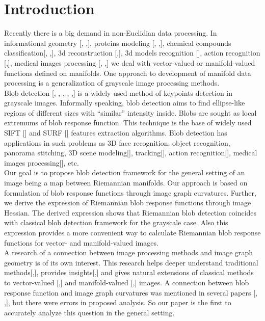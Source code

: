 \documentclass{llncs}
\begin{document}
\section{Introduction}
%
Recently there is a big demand in non-Euclidian data processing. In informational geometry [, ,], proteins modeling [, ,], chemical compounds classification[, ,], 3d reconstruction [,], 3d models recognition [], action recognition [,], medical images processing [, ,] we deal with vector-valued or manifold-valued functions defined on manifolds. One approach to development of manifold data processing is a generalization of grayscale image processing methods. 
\\
Blob detection [, , , , ,] is a widely used method of keypoints detection in grayscale images. Informally speaking, blob detection aims to find ellipse-like regions of different sizes with “similar” intensity inside. Blobs are sought as local extremums of blob response function. This technique is the base of widely used SIFT [] and SURF [] features extraction algorithms. Blob detection has applications in such problems as 3D face recognition, object recognition, panorama stitching, 3D scene modeling[], tracking[], action recognition[], medical images processing[], etc.
\\
Our goal is to propose blob detection framework for the general setting of an image being a map between Riemannian manifolds. Our approach is based on formulation of blob response functions through image graph curvatures. Further, we derive the expression of Riemannian blob response functions through image Hessian. The derived expression shows that Riemannian blob detection coincides with classical blob detection framework for the grayscale case. Also this expression provides a more convenient way to calculate Riemannian blob response functions for vector- and manifold-valued images.
\\
A research of a connection between image processing methods and image graph geometry is of its own interest. This research helps deeper understand traditional methods[,], provides insights[,] and gives natural extensions of classical methods to vector-valued [,] and manifold-valued [,] images. A connection between blob response function and image graph curvatures was mentioned in several papers [, ,], but there were errors in proposed analysis. So our paper is the first to accurately analyze this question in the general setting.
\end{document}
